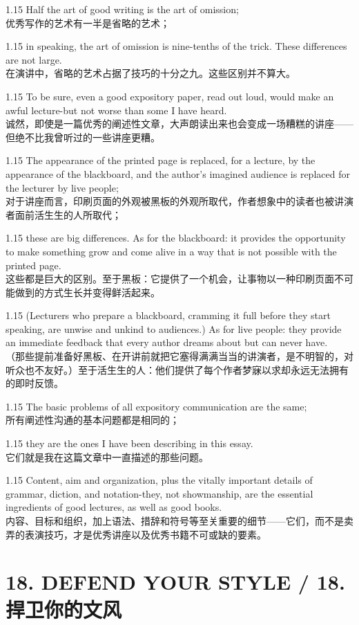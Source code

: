 \documentclass[12pt,a4paper]{article}
\newcommand{\bilingual}[2]{
    \begin{spacing}{1.15} %
        \noindent \normalsize #1 \\[-0.5ex] %
        \small \textcolor{blue!70!black}{#2} %
    \end{spacing}
    \vspace{0.8em} %
}
\begin{document}
\bilingual{Half the art of good writing is the art of omission;}
{优秀写作的艺术有一半是省略的艺术；} %

\bilingual{in speaking, the art of omission is nine-tenths of the trick. These differences are not large.}
{在演讲中，省略的艺术占据了技巧的十分之九。这些区别并不算大。} %

\bilingual{To be sure, even a good expository paper, read out loud, would make an awful lecture-but not worse than some I have heard.}
{诚然，即使是一篇优秀的阐述性文章，大声朗读出来也会变成一场糟糕的讲座——但绝不比我曾听过的一些讲座更糟。} %

\bilingual{The appearance of the printed page is replaced, for a lecture, by the appearance of the blackboard, and the author's imagined audience is replaced for the lecturer by live people;}
{对于讲座而言，印刷页面的外观被黑板的外观所取代，作者想象中的读者也被讲演者面前活生生的人所取代；} %

\bilingual{these are big differences. As for the blackboard: it provides the opportunity to make something grow and come alive in a way that is not possible with the printed page.}
{这些都是巨大的区别。至于黑板：它提供了一个机会，让事物以一种印刷页面不可能做到的方式生长并变得鲜活起来。} %

\bilingual{(Lecturers who prepare a blackboard, cramming it full before they start speaking, are unwise and unkind to audiences.) As for live people: they provide an immediate feedback that every author dreams about but can never have.}
{（那些提前准备好黑板、在开讲前就把它塞得满满当当的讲演者，是不明智的，对听众也不友好。）至于活生生的人：他们提供了每个作者梦寐以求却永远无法拥有的即时反馈。} %

\bilingual{The basic problems of all expository communication are the same;}
{所有阐述性沟通的基本问题都是相同的；} %

\bilingual{they are the ones I have been describing in this essay.}
{它们就是我在这篇文章中一直描述的那些问题。} %

\bilingual{Content, aim and organization, plus the vitally important details of grammar, diction, and notation-they, not showmanship, are the essential ingredients of good lectures, as well as good books.}
{内容、目标和组织，加上语法、措辞和符号等至关重要的细节——它们，而不是卖弄的表演技巧，才是优秀讲座以及优秀书籍不可或缺的要素。} %

\section*{18. DEFEND YOUR STYLE / 18. 捍卫你的文风} %
\end{document}

